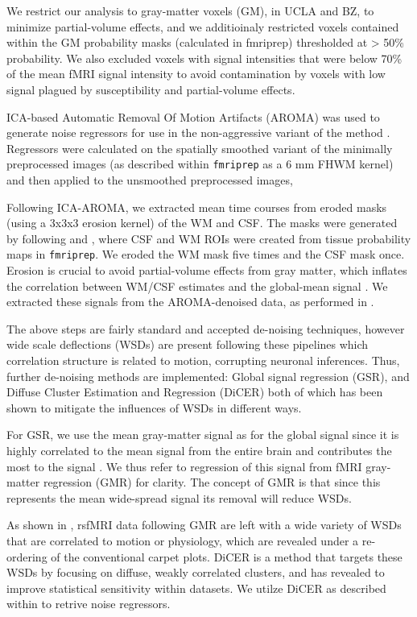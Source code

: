 \documentclass[oneside]{zHenriquesLab-StyleBioRxiv}
\begin{document}
We restrict our analysis to gray-matter voxels (GM), in UCLA and BZ, to minimize partial-volume effects, and we additioinaly restricted voxels contained within the GM probability masks (calculated in fmriprep) thresholded at > 50\% probability. We also excluded voxels with signal intensities that were below 70\% of the mean fMRI signal intensity to avoid contamination by voxels with low signal plagued by susceptibility and partial-volume effects.

ICA-based Automatic Removal Of Motion Artifacts (AROMA) was used to generate noise regressors for use in the non-aggressive variant of the method \cite{aroma}. Regressors were calculated on the spatially smoothed variant of the minimally preprocessed images (as described within \verb|fmriprep| as a $6$ mm FHWM kernel) and then applied to the unsmoothed preprocessed images,

Following ICA-AROMA, we extracted mean time courses from eroded masks (using a 3x3x3 erosion kernel) of the WM and CSF. The masks were generated by following \citet{Parkes:2018dz} and \citet{power2017sources}, where CSF and WM ROIs were created from tissue probability maps in \verb|fmriprep|. We eroded the WM mask five times and the CSF mask once. Erosion is crucial to avoid partial-volume effects from gray matter, which inflates the correlation between WM/CSF estimates and the global-mean signal \cite{power_fd_dvars,Parkes:2018dz}. We extracted these signals from the AROMA-denoised data, as performed in \citet{aroma}.

The above steps are fairly standard and accepted de-noising techniques, however wide scale deflections (WSDs) are present following these pipelines which correlation structure is related to motion, corrupting neuronal inferences. Thus, further de-noising methods are implemented: Global signal regression (GSR), and Diffuse Cluster Estimation and Regression (DiCER) both of which has been shown to mitigate the influences of WSDs in different ways. 

For GSR, we use the mean gray-matter signal as for the global signal since it is highly correlated to the mean signal from the entire brain and contributes the most to the signal \cite{power2017sources,Glasser:2018dt}. We thus refer to regression of this signal from fMRI gray-matter regression (GMR) for clarity. The concept of GMR is that since this represents the mean wide-spread signal its removal will reduce WSDs.

As shown in \cite{aquino2019identifying}, rsfMRI data following GMR are left with a wide variety of WSDs that are correlated to motion or physiology, which are  revealed under a re-ordering of the conventional carpet plots. DiCER is a method that targets these WSDs by focusing on diffuse, weakly correlated clusters, and has revealed to improve statistical sensitivity within datasets. We utilze DiCER as described within \citet{aquino2019identifying} to retrive noise regressors.
\end{document}
